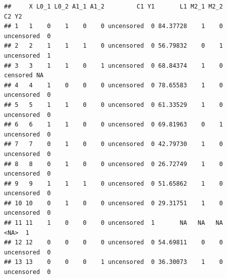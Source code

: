 \documentclass[
]{book}
\newenvironment{Shaded}{\begin{snugshade}}{\end{snugshade}}
\newcommand{\AttributeTok}[1]{\textcolor[rgb]{0.13,0.29,0.53}{#1}}
\newcommand{\CommentTok}[1]{\textcolor[rgb]{0.56,0.35,0.01}{\textit{#1}}}
\newcommand{\DecValTok}[1]{\textcolor[rgb]{0.00,0.00,0.81}{#1}}
\newcommand{\DocumentationTok}[1]{\textcolor[rgb]{0.56,0.35,0.01}{\textbf{\textit{#1}}}}
\newcommand{\FunctionTok}[1]{\textcolor[rgb]{0.13,0.29,0.53}{\textbf{#1}}}
\newcommand{\NormalTok}[1]{#1}
\newcommand{\OtherTok}[1]{\textcolor[rgb]{0.56,0.35,0.01}{#1}}
\newcommand{\SpecialCharTok}[1]{\textcolor[rgb]{0.81,0.36,0.00}{\textbf{#1}}}
\begin{document}
\begin{Shaded}
\end{Shaded}

\begin{verbatim}
##     X L0_1 L0_2 A1_1 A1_2         C1 Y1       L1 M2_1 M2_2         C2 Y2
## 1   1    0    1    0    0 uncensored  0 84.37728    1    0 uncensored  0
## 2   2    1    1    1    0 uncensored  0 56.79832    0    1 uncensored  1
## 3   3    1    1    0    1 uncensored  0 68.84374    1    0   censored NA
## 4   4    1    0    0    0 uncensored  0 78.65583    1    0 uncensored  0
## 5   5    1    1    0    0 uncensored  0 61.33529    1    0 uncensored  0
## 6   6    1    1    0    0 uncensored  0 69.81963    0    1 uncensored  0
## 7   7    0    1    0    0 uncensored  0 42.79730    1    0 uncensored  0
## 8   8    0    1    0    0 uncensored  0 26.72749    1    0 uncensored  0
## 9   9    1    1    1    0 uncensored  0 51.65862    1    0 uncensored  0
## 10 10    0    1    0    0 uncensored  0 29.31751    1    0 uncensored  0
## 11 11    1    0    0    0 uncensored  1       NA   NA   NA       <NA>  1
## 12 12    0    0    0    0 uncensored  0 54.69811    0    0 uncensored  0
## 13 13    0    0    0    1 uncensored  0 36.30073    1    0 uncensored  0
\end{verbatim}
\end{document}
